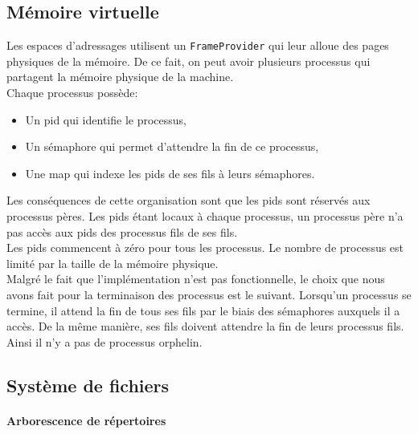 \documentclass{report}
\newcommand{\myparagraph}[1]{\paragraph*{#1}\mbox{}\\}
\begin{document}
\subsection*{Mémoire virtuelle}
Les espaces d'adressages utilisent un \texttt{FrameProvider} qui leur alloue des pages physiques de la mémoire. De ce fait, on peut avoir plusieurs processus qui partagent la mémoire physique de la machine.\\
Chaque processus possède:
\begin{itemize}
	\item Un pid qui identifie le processus,
	\item Un sémaphore qui permet d'attendre la fin de ce processus,
	\item Une map qui indexe les pids de ses fils à leurs sémaphores.
\end{itemize}
Les conséquences de cette organisation sont que les pids sont réservés aux processus pères. Les pids étant locaux à chaque processus, un processus père n'a pas accès aux pids des processus fils de ses fils.\\
Les pids commencent à zéro pour tous les processus. Le nombre de processus est limité par la taille de la mémoire physique.\\

Malgré le fait que l'implémentation n'est pas fonctionnelle, le choix que nous avons fait pour la terminaison des processus est le suivant.
Lorsqu'un processus se termine, il attend la fin de tous ses fils par le biais des sémaphores auxquels il a accès.
De la même manière, ses fils doivent attendre la fin de leurs processus fils. Ainsi il n'y a pas de processus orphelin.

\subsection*{Système de fichiers}
\myparagraph{Arborescence de répertoires}
	
\end{document}
